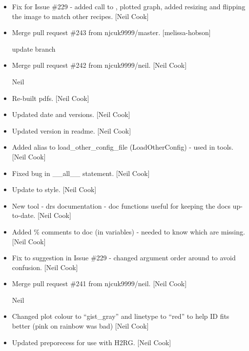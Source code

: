 \documentclass[a4paper,10pt,english]{report}
\begin{document}
\begin{itemize}
\item {} 
Fix for Issue \#229 - added call to
, plotted graph, added resizing
and flipping the image to match other recipes. {[}Neil Cook{]}

\item {} 
Merge pull request \#243 from njcuk9999/master. {[}melissa-hobson{]}

update branch

\item {} 
Merge pull request \#242 from njcuk9999/neil. {[}Neil Cook{]}

Neil

\item {} 
Re-built pdfs. {[}Neil Cook{]}

\item {} 
Updated date and versions. {[}Neil Cook{]}

\item {} 
Updated version in readme. {[}Neil Cook{]}

\item {} 
Added alias to load\_other\_config\_file (LoadOtherConfig) - used in
tools. {[}Neil Cook{]}

\item {} 
Fixed bug in \_\_all\_\_ statement. {[}Neil Cook{]}

\item {} 
Update to style. {[}Neil Cook{]}

\item {} 
New tool - drs documentation - doc functions useful for keeping the
docs up-to-date. {[}Neil Cook{]}

\item {} 
Added \% comments to doc (in variables) - needed to know which are
missing. {[}Neil Cook{]}

\item {} 
Fix to suggestion in Issue \#229 - changed argument order around to
avoid confusion. {[}Neil Cook{]}

\item {} 
Merge pull request \#241 from njcuk9999/neil. {[}Neil Cook{]}

Neil

\item {} 
Changed plot colour to “gist\_gray” and linetype to “red” to help ID
fits better (pink on rainbow was bad) {[}Neil Cook{]}

\item {} 
Updated preporecess for use with H2RG. {[}Neil Cook{]}


\end{itemize}
\end{document}

